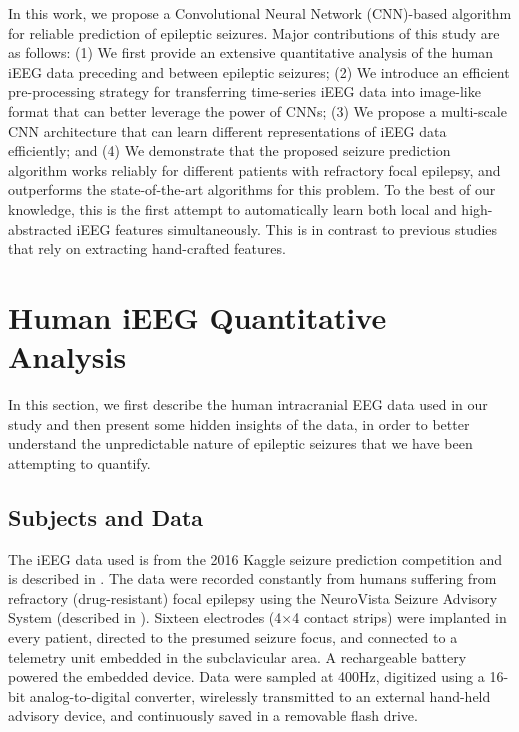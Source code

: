 \documentclass[journal]{IEEEtran}
\begin{document}
In this work, we propose a Convolutional Neural Network (CNN)-based algorithm for reliable prediction of epileptic seizures. Major contributions of this study are as follows: 
(1) We first provide an extensive quantitative analysis of the human iEEG data preceding and between epileptic seizures; 
(2) We introduce an efficient pre-processing strategy for transferring time-series iEEG data into image-like format that can better leverage the power of CNNs;
(3) We propose a multi-scale CNN architecture that can learn different representations of iEEG data efficiently; and
(4) We demonstrate that the proposed seizure prediction algorithm works reliably for different patients with refractory focal epilepsy, and outperforms the state-of-the-art algorithms for this problem.
To the best of our knowledge, this is the first attempt to automatically learn both local and high-abstracted iEEG features simultaneously. This is in contrast to previous studies that rely on extracting hand-crafted features.








\section{Human iEEG Quantitative Analysis}
\label{Section2}

In this section, we first describe the human intracranial EEG data used in our study and then present some hidden insights of the data, in order to better understand the unpredictable nature of epileptic seizures that we have been attempting to quantify.



\subsection{Subjects and Data}

The iEEG data used is from the 2016 Kaggle seizure prediction competition and is described in \cite{kuhlmann2018epilepsyecosystem}. The data were recorded constantly from humans suffering from refractory (drug-resistant) focal epilepsy using the NeuroVista Seizure Advisory System (described in \cite{cook2013prediction}). Sixteen electrodes (4$\times$4 contact strips) were implanted in every patient, directed to the presumed seizure focus, and connected to a telemetry unit embedded in the subclavicular area. A rechargeable battery powered the embedded device. Data were sampled at 400Hz, digitized using a 16-bit analog-to-digital converter, wirelessly transmitted to an external hand-held advisory device, and continuously saved in a removable flash drive.
\end{document}
